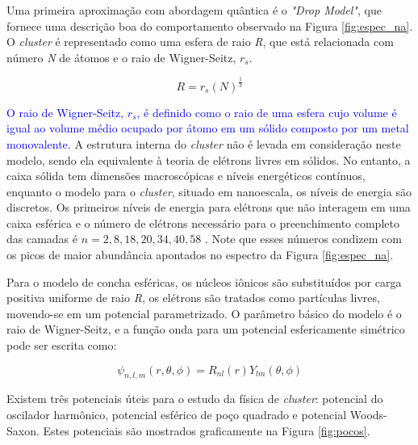 Uma primeira aproximação com abordagem quântica é o \textit{"Drop Model"}, que fornece uma descrição boa do comportamento observado na Figura \ref{fig:espec_na}. O \textit{cluster} é representado como uma esfera de raio \textit{R}, que está relacionada com número \textit{N} de átomos e o raio de Wigner-Seitz, $r_{s}$\cite{capitulo_livro_shell}\cite{livro_cap16_Misra2012527}.


\begin{equation}
\label{eq:raio_R}
    R = r_{s}(N)^{\frac{1}{3}}
\end{equation}

\textcolor{blue}{O raio de Wigner-Seitz, $r_{s}$, é definido como o raio de uma esfera cujo volume é igual ao volume médio ocupado por átomo em um sólido composto por um metal monovalente.}
A estrutura interna do \textit{cluster} não é levada em consideração neste modelo, sendo ela equivalente à teoria de elétrons livres em sólidos. No entanto, a caixa sólida tem dimensões macroscópicas e níveis energéticos contínuos, enquanto o modelo para o \textit{cluster}, situado em nanoescala, os níveis de energia são discretos. Os primeiros níveis de energia para elétrons que não interagem em uma caixa esférica e o número de elétrons necessário para o preenchimento completo das camadas é $n= 2,8,18,20,34,40,58$ \cite{livro_cap16_Misra2012527}. Note que esses números condizem com os picos de maior abundância apontados no espectro da Figura \ref{fig:espec_na}.






Para o modelo de concha esféricas, os núcleos iônicos são substituídos por carga positiva uniforme de raio \textit{R}, os elétrons são tratados como partículas livres, movendo-se em um potencial parametrizado. O parâmetro básico do modelo é o raio de Wigner-Seitz, e a função onda para um potencial esfericamente simétrico pode ser escrita como:

\begin{equation}
    \psi_{ n,l,m}(r, \theta, \phi) = R_{nl}(r)Y_{lm}(\theta, \phi)
\end{equation}

Existem três potenciais úteis para o estudo da física de \textit{cluster}: potencial do oscilador harmônico, potencial esférico de poço quadrado e potencial Woods-Saxon. Estes potenciais são mostrados graficamente na Figura \ref{fig:pocos}. 

